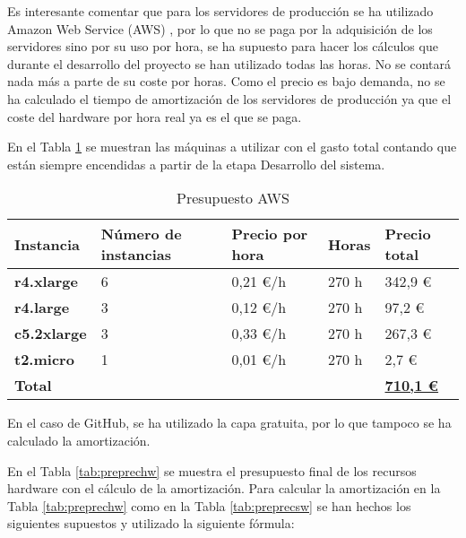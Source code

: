 Es interesante comentar que para los servidores de producción se ha utilizado Amazon Web Service (AWS) \cite{Tfg:aws}, por lo que no se paga por la adquisición de los servidores sino por su uso por hora, se ha supuesto para hacer los cálculos que durante el desarrollo del proyecto se han utilizado todas las horas. No se contará nada más a parte de su coste por horas. Como el precio es bajo demanda, no se ha calculado el tiempo de amortización de los servidores de producción ya que el coste del hardware por hora real ya es el que se paga. 

En el Tabla \ref{tab:prepaws} se muestran las máquinas a utilizar con el gasto total contando que están siempre encendidas a partir de la etapa Desarrollo del sistema.

\begin{table}[H]\label{tab:prepaws}
	\centering
	\begin{tabular}{|l|l|l|l|l|}
		\hline
		\textbf{Instancia}  & \textbf{Número de instancias} & \textbf{Precio por hora} & \textbf{Horas} & \textbf{Precio total} \\ \hline
		\textbf{r4.xlarge}  & 6                             & 0,21 €/h \cite{Tfg:ec2price} & 270 h          & 342,9 €               \\ \hline
		\textbf{r4.large}   & 3                             & 0,12 €/h \cite{Tfg:ec2price} & 270 h          & 97,2 €                \\ \hline
		\textbf{c5.2xlarge} & 3                             & 0,33 €/h \cite{Tfg:ec2price} & 270 h          & 267,3 €               \\ \hline
		\textbf{t2.micro}   & 1                             & 0,01 €/h \cite{Tfg:ec2price} & 270 h          & 2,7 €                 \\ \hline
		\multicolumn{4}{|l|}{\textbf{Total}} & \textbf{\underline{710,1 €}}                                                   \\ \hline
	\end{tabular}
	\caption{Presupuesto AWS}
\end{table}

En el caso de GitHub, se ha utilizado la capa gratuita, por lo que tampoco se ha calculado la amortización.

En el Tabla \ref{tab:preprechw} se muestra el presupuesto final de los recursos hardware con el cálculo de la amortización. Para calcular la amortización en la Tabla \ref{tab:preprechw} como en la Tabla \ref{tab:preprecsw} se han hechos los siguientes supuestos y utilizado la siguiente fórmula:

